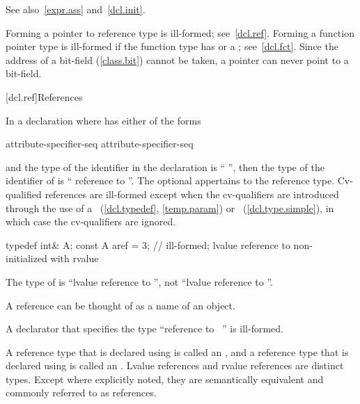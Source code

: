 \pnum
See also~\ref{expr.ass} and~\ref{dcl.init}.

\pnum
\begin{note}
Forming a pointer to reference type is ill-formed; see~\ref{dcl.ref}.
Forming a function pointer type is ill-formed if the function type has
 or a ;
see~\ref{dcl.fct}.
Since the address of a bit-field (\ref{class.bit}) cannot be taken,
a pointer can never point to a bit-field.
\end{note}

[dcl.ref]{References}%

\pnum
In a declaration
where
has either of the forms

\begin{ncsimplebnf}
\terminal{\&} attribute-specifier-seq\opt{} \br
\terminal{\&\&} attribute-specifier-seq\opt{} 
\end{ncsimplebnf}

and the type of the identifier in the declaration
is ``
'',
then the type of the identifier of
is `` reference to
''.
The optional  appertains to the reference type.
Cv-qualified references are ill-formed except when the cv-qualifiers
are introduced through the use of a
~(\ref{dcl.typedef}, \ref{temp.param}) or
~(\ref{dcl.type.simple}),
in which case the cv-qualifiers are ignored.
\begin{example}

\begin{codeblock}
typedef int& A;
const A aref = 3;   // ill-formed; lvalue reference to non- initialized with rvalue
\end{codeblock}

The type of
is ``lvalue reference to '',
not ``lvalue reference to ''.
\end{example}
\begin{note}
A reference can be thought of as a name of an object.
\end{note}
%
A declarator that specifies the type
``reference to \cv{}~''
is ill-formed.


\pnum
{}%
%
A reference type that is declared using \tcode{\&} is called an
, and a reference type that
is declared using \tcode{\&\&} is called an
. Lvalue references and
rvalue references are distinct types. Except where explicitly noted, they are
semantically equivalent and commonly referred to as references.

